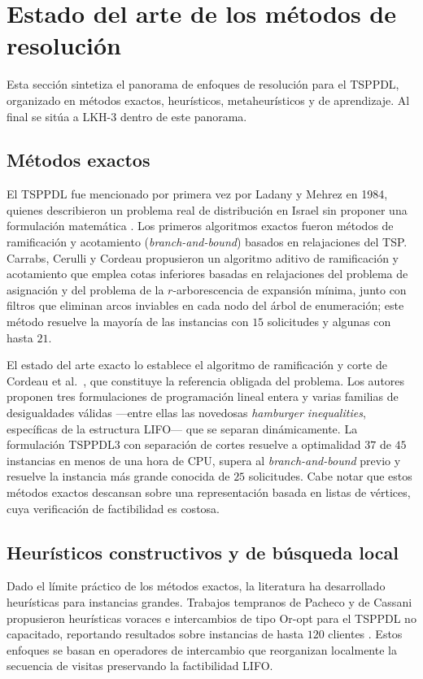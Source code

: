 \documentclass[conference]{IEEEtran}
\begin{document}
\section{Estado del arte de los métodos de resolución}\label{sec:sota}
Esta sección sintetiza el panorama de enfoques de resolución para el TSPPDL, organizado en métodos exactos, heurísticos, metaheurísticos y de aprendizaje. Al final se sitúa a LKH-3 dentro de este panorama.

\subsection{Métodos exactos}
El TSPPDL fue mencionado por primera vez por Ladany y Mehrez en 1984, quienes describieron un problema real de distribución en Israel sin proponer una formulación matemática \cite{cordeau2010}. Los primeros algoritmos exactos fueron métodos de ramificación y acotamiento (\textit{branch-and-bound}) basados en relajaciones del TSP. Carrabs, Cerulli y Cordeau \cite{carrabs2007bb} propusieron un algoritmo aditivo de ramificación y acotamiento que emplea cotas inferiores basadas en relajaciones del problema de asignación y del problema de la $r$-arborescencia de expansión mínima, junto con filtros que eliminan arcos inviables en cada nodo del árbol de enumeración; este método resuelve la mayoría de las instancias con $15$ solicitudes y algunas con hasta $21$.

El estado del arte exacto lo establece el algoritmo de ramificación y corte de Cordeau et al.\ \cite{cordeau2010}, que constituye la referencia obligada del problema. Los autores proponen tres formulaciones de programación lineal entera y varias familias de desigualdades válidas —entre ellas las novedosas \textit{hamburger inequalities}, específicas de la estructura LIFO— que se separan dinámicamente. La formulación TSPPDL3 con separación de cortes resuelve a optimalidad $37$ de $45$ instancias en menos de una hora de CPU, supera al \textit{branch-and-bound} previo y resuelve la instancia más grande conocida de $25$ solicitudes. Cabe notar que estos métodos exactos descansan sobre una representación basada en listas de vértices, cuya verificación de factibilidad es costosa.

\subsection{Heurísticos constructivos y de búsqueda local}
Dado el límite práctico de los métodos exactos, la literatura ha desarrollado heurísticas para instancias grandes. Trabajos tempranos de Pacheco y de Cassani propusieron heurísticas voraces e intercambios de tipo Or-opt para el TSPPDL no capacitado, reportando resultados sobre instancias de hasta $120$ clientes \cite{cordeau2010}. Estos enfoques se basan en operadores de intercambio que reorganizan localmente la secuencia de visitas preservando la factibilidad LIFO.
\end{document}
